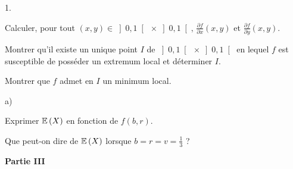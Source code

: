 \documentclass[11pt]{article}%
\begin{document}
\begin{noliste}{1.}
 \setlength{\itemsep}{4mm}
\item Calculer, pour tout $\left( x,y\right) \in \left] 0,1\right[ \
\times \left] 0,1\right[,\,\frac{\partial f}{\partial x}\left(
x,y\right) $ et $\frac{\partial f}{\partial y}\left( x,y\right).$

\item Montrer qu'il existe un unique point $I$ de $\left] 0,1\right[ \
\times \left] 0,1\right[ $ en lequel $f$ est susceptible de posséder un
extremum local et déterminer $I.$

\item Montrer que $f$ admet en $I$ un minimum local.

\item 
\begin{noliste}{a)}
 \setlength{\itemsep}{2mm}
\item Exprimer $\mathbb{E}\left( X\right) $ en fonction de $f\left( b,r\right)
$.

\item Que peut-on dire de $\mathbb{E}\left( X\right) $ lorsque $b = r = v =
\frac{1}{3}$ ?
\end{noliste}
\end{noliste}

\begin{center}
\textbf{Partie III}
\end{center}
\end{document}
